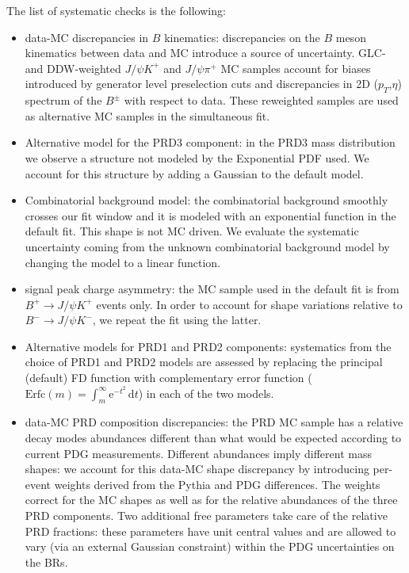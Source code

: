 The list of systematic checks is the following:
\begin{itemize}
    \setlength{\itemsep}{0pt}%
	\setlength{\parskip}{0pt}%
    \item data-MC discrepancies in $B$ kinematics: discrepancies on the $B$ meson kinematics
	between data and MC introduce a source of uncertainty. GLC- and DDW-weighted $J/\psi K^+$
	and $J/\psi \pi^+$ MC samples account for biases introduced by generator level
	preselection cuts and discrepancies in 2D ($p_{T}$,$\eta$) spectrum of the $B^{\pm}$ with
	respect to data. These reweighted samples are used as alternative MC samples in the simultaneous
	fit.

    \item Alternative model for the PRD3 component: in the PRD3 mass distribution we observe a
	structure not modeled by the Exponential PDF used. We account for this structure by
	adding a Gaussian to the default model.

    \item Combinatorial background model: the combinatorial background smoothly crosses our fit
	window and it is modeled with an exponential function in the default fit. This shape is not
	MC driven. We evaluate the systematic uncertainty coming from the unknown combinatorial
	background model by changing the model to a linear function.

    \item \BpmKpmJpsi{} signal peak charge asymmetry: the MC sample used in the default fit
	is from $B^+ \to J/\psi K^+$ events only. In order to account for shape variations relative to
	$B^- \to J/\psi K^-$, we repeat the fit using the latter.

    \item Alternative models for PRD1 and PRD2 components: systematics from the choice of PRD1
	and PRD2 models are assessed by replacing the principal (default) FD function with
	complementary error function ($\text{Erfc}(m) = \int_m^\infty \mathrm{e}^{-t^2}\,\mathrm{d}t $)
	in each of the two models.

    \item data-MC PRD composition discrepancies: the PRD MC sample has a relative decay modes
	abundances different than what would be expected according to current PDG measurements.
	Different abundances imply different mass shapes: we account for this data-MC shape
	discrepancy by introducing per-event weights derived from the Pythia and PDG differences.
	The weights correct for the MC shapes as well as for the relative abundances of the three
	PRD components. Two additional free parameters take care of the relative PRD fractions:
	these parameters have unit central values and are allowed to vary (via an external Gaussian
	constraint) within the PDG uncertainties on the BRs.


\end{itemize}

